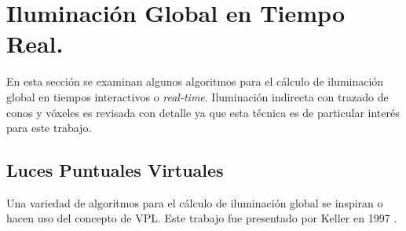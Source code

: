 \section{Iluminación Global en Tiempo Real.}
\label{sec:interactive_gi_takes}
En esta sección se examinan algunos algoritmos para el cálculo de iluminación global en tiempos interactivos o \emph{real-time}. Iluminación indirecta con trazado de conos y vóxeles es revisada con detalle ya que esta técnica es de particular interés para este trabajo.

\subsection{Luces Puntuales Virtuales}
Una variedad de algoritmos para el cálculo de iluminación global se inspiran o hacen uso del concepto de \ac{VPL}. Este trabajo fue presentado por Keller en 1997 \cite{Keller:1997}.

